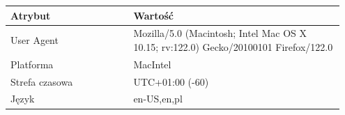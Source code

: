 \begin{table}[p]
    \small
    \centering
    \begin{tabular}{|p{0.35\linewidth} | p{0.6\linewidth}|}
        \hline
        \textbf{Atrybut}             & \textbf{Wartość}                                                                                                                                                                                                                                                                                                                                                                                                                              \\ \hline
        User Agent                   & Mozilla/5.0 (Macintosh; Intel Mac OS X 10.15; rv:122.0) Gecko/20100101 Firefox/122.0                                                                                                                                                                                                                                                                                                                                                          \\ \hline
        Platforma                    & MacIntel                                                                                                                                                                                                                                                                                                                                                                                                                                      \\ \hline
        Strefa czasowa               & UTC+01:00 (-60)                                                                                                                                                                                                                                                                                                                                                                                                                               \\ \hline
        Język                        & en-US,en,pl                                                                                                                                                                                                                                                                                                                                                                                                                                   \\ \hline

\end{tabular}
\end{table}
